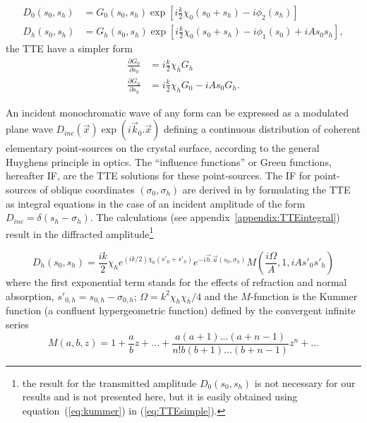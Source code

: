 \documentclass[preprint]{iucr}              %
\newcommand{\inred}[1]{{\color{red}#1}}
\begin{document}
\begin{subequations}
    \label{eq:functionsG}
    \begin{align}
      D_0(s_0,s_h) &= G_0(s_0,s_h) \exp[i\frac{k}{2}\chi_0 (s_0+s_h)-i \phi_2(s_h)]\\
      D_h(s_0,s_h) &= G_h(s_0,s_h) \exp[i\frac{k}{2}\chi_0 (s_0+s_h)-i \phi_1(s_0)+iAs_0s_h],
    \end{align}
\end{subequations}
the TTE have a simpler form
\begin{subequations}
    \label{eq:TTEsimple}
    \begin{align}
      \frac{\partial G_0}{\partial s_0} &= i \frac{k}{2}\chi_{\bar{h}} G_h
      \\
      \frac{\partial G_h}{\partial s_h} &= i \frac{k}{2}\chi_{h} G_0 - i A s_0 G_h.
    \end{align}
\end{subequations}

An incident monochromatic wave of any form can be expressed as a modulated plane wave $D_{inc}(\vec x)\exp(i \vec k_0 . \vec x)$ defining a continuous distribution of coherent elementary point-sources on the crystal surface, according to the general Huyghens principle in optics. The “influence functions” \inred{or Green functions}, hereafter IF, are the TTE solutions \inred{for} these point-sources. 
The IF for point-sources of oblique coordinates $(\sigma_0,\sigma_h)$
are derived in \cite{GuigayFerrero2016} by formulating the TTE  as integral equations in the case of an incident \inred{amplitude} of the form \inred{$D_{inc}=\delta(s_h-\sigma_h)$}. 
The calculations (see appendix~\ref{appendix:TTEintegral}) result in the diffracted amplitude\footnote{the result for the transmitted amplitude $D_0(s_0,s_h)$ is not necessary for our results and is not presented here, but it is easily obtained using equation~(\ref{eq:kummer}) in (\ref{eq:TTEsimple}).}

  
\begin{equation}
\label{eq:kummer}
    D_h(s_0,s_h) = \frac{i k }{2} \chi_h e^{(ik/2) \chi_0 (s'_0 + s'_h)} e^{-i \vec h . \vec u (s_0,\sigma_h)} M(\frac{i\Omega}{A},1,iA s'_0 s'_h)
\end{equation}
where the first exponential term stands for the effects of refraction and normal absorption, $s'_{0,h}=s_{0,h}-\sigma_{0,h}$; $\Omega=k^2\chi_h\chi_{\bar{h}}/4$ and the $M$-function is the Kummer function (a confluent hypergeometric function) defined by the convergent infinite series
\begin{equation}
\label{eq:kummerSeries}
    M(a,b,z) = 1 + \frac{a}{b} z + 
    ... + \frac{a(a+1)...(a+n-1)}{n! b (b+1)...(b+n-1)}z^n+...
\end{equation}
\end{document}
